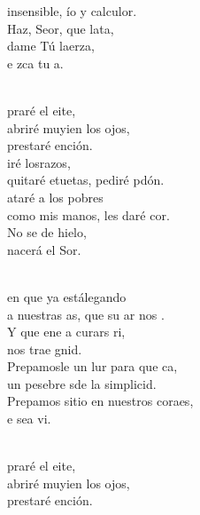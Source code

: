 \documentclass[12pt]{article}
\begin{document}
\begin{multicols*}{2}
\begin{cancion}
	insensible, ío y calculor.\\
	Haz, Seor, que lata, \\
	dame Tú laerza,\\
	e zca tu a.\\\jump\\
	\begin{chorus}%
	praré el eite, \\
	abriré muyien los ojos, \\
	prestaré ención.\\
	iré losrazos, \\
	quitaré etuetas, pediré pdón.\\
	ataré a los pobres \\
	como mis manos, les daré cor.\\
	No se de hielo,  \\
	nacerá el Sor.\\
	\end{chorus}%
	\jump\\
	en que ya estálegando  \\
	a nuestras as, que su ar nos .\\
	Y que ene a curars  ri, \\
	nos trae gnid.\\
	Prepamosle un lur para que ca,  \\
	un pesebre sde la simplicid.\\
	Prepamos sitio en nuestros coraes,\\
	e sea vi.\\\jump\\
	\begin{chorus}%
	praré el eite, \\
	abriré muyien los ojos, \\
	prestaré ención.\\

\end{chorus}
\end{cancion}
\end{multicols*}
\end{document}
